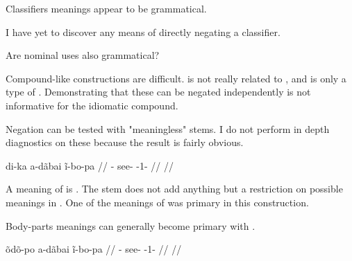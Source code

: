 \documentclass{beamer}
\begin{document}
\begin{frame}{Classifiers meanings appear to be grammatical.}

  I have yet to discover any means of directly negating a classifier.
  
\end{frame}

\begin{frame}{Are nominal uses also grammatical?}

  Compound-like constructions are difficult.
   is not really related to , and is only a type of .
  Demonstrating that these can be negated independently is not informative for the idiomatic compound.
  
\end{frame}

\begin{frame}{Negation can be tested with "meaningless" stems.}
  I do not perform in depth diagnostics on these because the result is fairly obvious.
 
  \pex
  \a\begingl
  \gla di-ka a-dãbai ĩ-bo-pa //
  \glb {}- see- -1- //
  \glft {} //
  \endgl
  \xe
  
  A meaning of  is .
  The stem  does not add anything but a restriction on possible meanings in .
  One of the meanings of  was primary in this construction.
\end{frame}

\begin{frame}{Body-parts meanings can generally become primary with .}
 
  \pex
  \a\begingl
  \gla õdõ-po a-dãbai ĩ-bo-pa //
  \glb {}- see- -1- //
  \glft {} //
  \endgl
  \xe
  
\end{frame}


\end{document}
